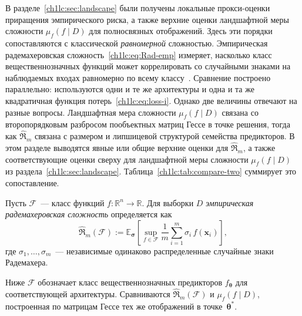 В разделе~\ref{ch1lc:sec:landscape} были получены локальные прокси-оценки приращения эмпирического риска, а также верхние оценки ландшафтной меры сложности $\mu_f(f\mid D)$ для полносвязных отображений.
Здесь эти порядки сопоставляются с классической \emph{равномерной} сложностью. Эмпирическая радемахеровская сложность~\eqref{ch1lc:eq:Rad-emp} измеряет, насколько класс вещественнозначных функций может коррелировать со случайными знаками на наблюдаемых входах равномерно по всему классу~\cite{bartlett2002rademacher}.
Сравнение построено параллельно: используются одни и те же архитектуры и одна и та же квадратичная функция потерь~\eqref{ch1lc:eq:loss-i}. Однако две величины отвечают на разные вопросы. Ландшафтная мера сложности $\mu_f(f\mid D)$ связана со второпорядковым разбросом пообъектных матриц Гессе в точке решения, тогда как $\hat{\mathfrak{R}}_m$ связана с размером и липшицевой структурой семейства предикторов.
В этом разделе выводятся явные или общие верхние оценки для $\hat{\mathfrak{R}}_m$, а также соответствующие оценки сверху для ландшафтной меры сложности $\mu_f(f\mid D)$ из раздела~\ref{ch1lc:sec:landscape}. Таблица~\ref{ch1lc:tab:compare-two} суммирует это сопоставление.

\begin{definition}\label{ch1lc:def:rademacher}
Пусть $\mathcal{F}$~--- класс функций $f:\mathbb{R}^n\to\mathbb{R}$.
Для выборки $D$ \emph{эмпирическая радемахеровская сложность} определяется как
\begin{equation}\label{ch1lc:eq:Rad-emp}
  \hat{\mathfrak{R}}_m(\mathcal{F})
  := \mathbb{E}_{\boldsymbol{\sigma}}
  \left[
    \sup_{f\in\mathcal{F}}
    \frac{1}{m}\sum_{i=1}^{m}\sigma_i\, f(\mathbf{x}_i)
  \right],
\end{equation}
где $\sigma_1,\ldots,\sigma_m$~--- независимые одинаково распределенные случайные знаки Радемахера.
\end{definition}
\noindent
Ниже $\mathcal{F}$ обозначает класс вещественнозначных предикторов $f_{\boldsymbol{\theta}}$ для соответствующей архитектуры. Сравниваются $\hat{\mathfrak{R}}_m(\mathcal{F})$ и $\mu_f(f\mid D)$, построенная по матрицам Гессе тех же отображений в точке~$\boldsymbol{\theta}^*$.

